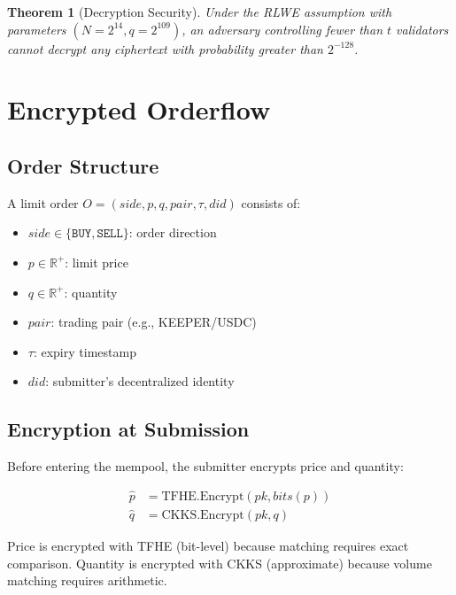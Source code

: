\documentclass[11pt,letterpaper]{article}
\newtheorem{theorem}{Theorem}
\theoremstyle{definition}
\theoremstyle{remark}
\newcommand{\TFHE}{\textsc{TFHE}}
\newcommand{\CKKS}{\textsc{CKKS}}
\begin{document}
\begin{theorem}[Decryption Security]
Under the \textsc{RLWE} assumption with parameters $(N = 2^{14}, q = 2^{109})$, an adversary controlling fewer than $t$ validators cannot decrypt any ciphertext with probability greater than $2^{-128}$.
\end{theorem}

\section{Encrypted Orderflow}
\label{sec:encrypted_orderflow}

\subsection{Order Structure}

A limit order $O = (\textit{side}, p, q, \textit{pair}, \tau, \textit{did})$ consists of:

\begin{itemize}
    \item $\textit{side} \in \{\texttt{BUY}, \texttt{SELL}\}$: order direction
    \item $p \in \mathbb{R}^+$: limit price
    \item $q \in \mathbb{R}^+$: quantity
    \item $\textit{pair}$: trading pair (e.g., KEEPER/USDC)
    \item $\tau$: expiry timestamp
    \item $\textit{did}$: submitter's decentralized identity
\end{itemize}

\subsection{Encryption at Submission}

Before entering the mempool, the submitter encrypts price and quantity:

\begin{align}
\hat{p} &= \text{TFHE.Encrypt}(pk, \textit{bits}(p)) \label{eq:enc_price} \\
\hat{q} &= \text{CKKS.Encrypt}(pk, q) \label{eq:enc_qty}
\end{align}

Price is encrypted with \TFHE{} (bit-level) because matching requires exact comparison. Quantity is encrypted with \CKKS{} (approximate) because volume matching requires arithmetic.
\end{document}
